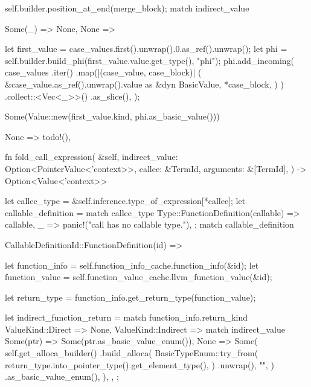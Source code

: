 \documentclass[
  oneside,
  english,
  coorientadorbanca,
  noabntexcite
]{ufsc-thesis-rn46-2019}
\begin{document}
\begin{rustcode}
{{{{                self.builder.position_at_end(merge_block);
                match indirect_value {
                    Some(_) => None,
                    None => {
                        let first_value = case_values.first().unwrap().0.as_ref().unwrap();
                        let phi = self.builder.build_phi(first_value.value.get_type(), "phi");
                        phi.add_incoming(
                            case_values
                                .iter()
                                .map(|(case_value, case_block)| {
                                    (
                                        &case_value.as_ref().unwrap().value as &dyn BasicValue,
                                        *case_block,
                                    )
                                })
                                .collect::<Vec<_>>()
                                .as_slice(),
                        );

                        Some(Value::new(first_value.kind, phi.as_basic_value()))
                    }
                }
            }

            None => todo!(),
        }
    }

    fn fold_call_expression(
        &self,
        indirect_value: Option<PointerValue<'context>>,
        callee: &TermId,
        arguments: &[TermId],
    ) -> Option<Value<'context>> {
        let callee_type = &self.inference.type_of_expression[*callee];
        let callable_definition = match callee_type {
            Type::FunctionDefinition(callable) => callable,
            _ => panic!("call has no callable type."),
        };
        match callable_definition {
            CallableDefinitionId::FunctionDefinition(id) => {
                let function_info = self.function_info_cache.function_info(&id);
                let function_value = self.function_value_cache.llvm_function_value(&id);

                let return_type = function_info.get_return_type(function_value);

                let indirect_function_return = match function_info.return_kind {
                    ValueKind::Direct => None,
                    ValueKind::Indirect => match indirect_value {
                        Some(ptr) => Some(ptr.as_basic_value_enum()),
                        None => Some(
                            self.get_alloca_builder()
                                .build_alloca(
                                    BasicTypeEnum::try_from(
                                        return_type.into_pointer_type().get_element_type(),
                                    )
                                    .unwrap(),
                                    "",
                                )
                                .as_basic_value_enum(),
                        ),
                    },
                };

}}}}
\end{rustcode}
\end{document}
